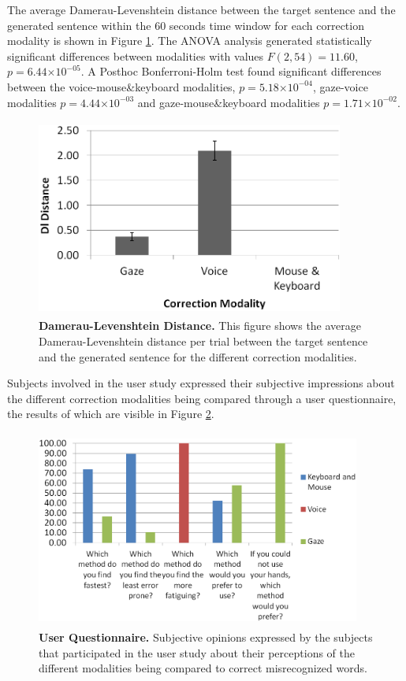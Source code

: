 \documentclass[]{article}
\providecommand{\e}[1]{\ensuremath{\times 10^{#1}}}
\begin{document}
The average Damerau-Levenshtein distance between the target sentence and the generated sentence within the 60 seconds
time window for each correction modality is shown in Figure \ref{dldistance}. The ANOVA analysis generated statistically
significant differences between modalities with values $F(2,54)=11.60$, $p=6.44\e{-05}$. A Posthoc Bonferroni-Holm test
found significant differences between the voice-mouse\&keyboard modalities, $p=5.18\e{-04}$, gaze-voice modalities
$p=4.44\e{-03}$ and gaze-mouse\&keyboard modalities $p=1.71\e{-02}$.


\begin{figure}[!ht]
\begin{center}
\includegraphics[width=0.9\textwidth,height=65mm]{figures/dldistance.png}
\end{center}
\caption{\textbf{Damerau-Levenshtein Distance.} This figure shows the average Damerau-Levenshtein distance per
trial between the target sentence and the generated sentence for the different correction modalities.}
\label{dldistance}
\end{figure}


Subjects involved in the user study  expressed their subjective impressions about the different correction
modalities being compared through a user questionnaire, the results of which are visible in Figure \ref{questionnaire}.


\begin{figure}[!ht]
\begin{center}
\vspace{-3mm}
\includegraphics[width=0.95\textwidth,height=65mm]{figures/questionnaire.png}
\end{center}
\caption{\textbf{User Questionnaire.} Subjective opinions expressed by the subjects that participated in the user
study about their perceptions of the different modalities being compared to correct misrecognized words.}
\label{questionnaire}
\end{figure}
\end{document}
